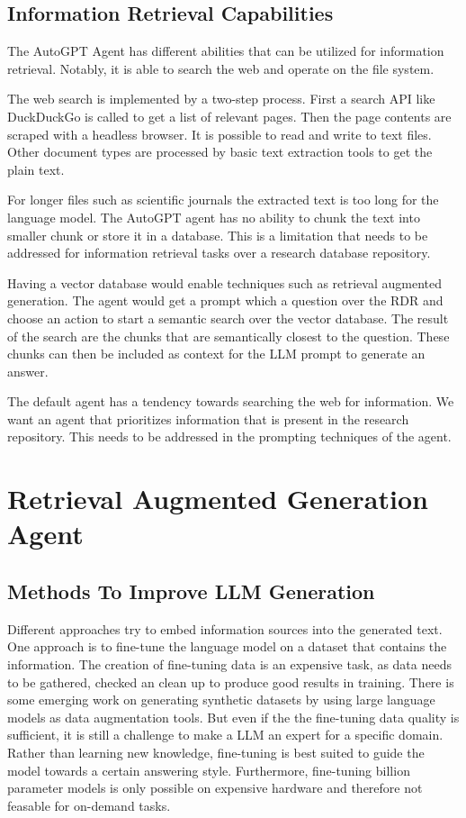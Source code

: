 \documentclass[english, version-2022-01]{uzl-thesis}
\begin{document}
\section{Information Retrieval Capabilities}


The AutoGPT Agent has different abilities that can be utilized for information retrieval.
Notably, it is able to search the web and operate on the file system.

The web search is implemented by a two-step process. First a search API like DuckDuckGo is called to get a list of relevant pages.
Then the page contents are scraped with a headless browser.
It is possible to read and write to text files.
Other document types are processed by basic text extraction tools to get the plain text.

For longer files such as scientific journals the extracted text is too long for the language model.
The AutoGPT agent has no ability to chunk the text into smaller chunk or store it in a database.
This is a limitation that needs to be addressed for information retrieval tasks over a research database repository.

Having a vector database would enable techniques such as retrieval augmented generation.
The agent would get a prompt which a question over the RDR and choose an action to start a semantic search over the vector database.
The result of the search are the chunks that are semantically closest to the question.
These chunks can then be included as context for the LLM prompt to generate an answer.

The default agent has a tendency towards searching the web for information. We want an agent that prioritizes information that is present in the research repository. This needs to be addressed in the prompting techniques of the agent.

\chapter{Retrieval Augmented Generation Agent}



\section{Methods To Improve LLM Generation}

Different approaches try to embed information sources into the generated text.
One approach is to fine-tune the language model on a dataset that contains the information.
The creation of fine-tuning data is an expensive task, as data needs to be gathered, checked an clean up to produce good results in training.
There is some emerging work on generating synthetic datasets by using large language models as data augmentation tools.
But even if the the fine-tuning data quality is sufficient, it is still a challenge to make a LLM an expert for a specific domain.
Rather than learning new knowledge, fine-tuning is best suited to guide the model towards a certain answering style.
Furthermore, fine-tuning billion parameter models is only possible on expensive hardware and therefore not feasable for on-demand tasks.
\end{document}
